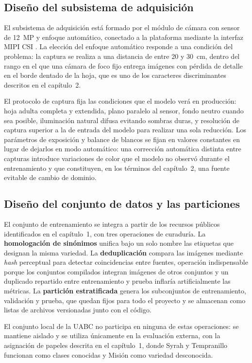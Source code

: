 \subsection{Diseño del subsistema de adquisición}

El subsistema de adquisición está formado por el módulo de cámara con sensor
de 12~MP y enfoque automático, conectado a la plataforma mediante la
interfaz MIPI CSI \citep{rpicam3}. La elección del enfoque automático
responde a una condición del problema: la captura se realiza a una distancia
de entre 20 y 30~cm, dentro del rango en el que una cámara de foco fijo
entrega imágenes con pérdida de detalle en el borde dentado de la hoja, que
es uno de los caracteres discriminantes descritos en el capítulo~2.

El protocolo de captura fija las condiciones que el modelo verá en
producción: hoja adulta completa y extendida, plano paralelo al sensor,
fondo neutro cuando sea posible, iluminación natural difusa evitando sombras
duras, y resolución de captura superior a la de entrada del modelo para
realizar una sola reducción. Los parámetros de exposición y balance de
blancos se fijan en valores constantes en lugar de dejarlos en modo
automático: una corrección automática distinta entre capturas introduce
variaciones de color que el modelo no observó durante el entrenamiento y que
constituyen, en los términos del capítulo~2, una fuente evitable de cambio de
dominio.

\subsection{Diseño del conjunto de datos y las particiones}

El conjunto de entrenamiento se integra a partir de los recursos públicos
identificados en el capítulo~1, con tres operaciones de curaduría. La
\textbf{homologación de sinónimos} unifica bajo un solo nombre las etiquetas
que designan la misma variedad. La \textbf{deduplicación} compara las
imágenes mediante \textit{hash} perceptual para detectar coincidencias entre
fuentes, operación indispensable porque los conjuntos compilados integran
imágenes de otros conjuntos y un duplicado repartido entre entrenamiento y
prueba inflaría artificialmente las métricas. La \textbf{partición
estratificada} genera los subconjuntos de entrenamiento, validación y prueba,
que quedan fijos para todo el proyecto y se almacenan como listas de archivos
versionadas junto con el código.

El conjunto local de la UABC no participa en ninguna de estas operaciones:
se mantiene aislado y se utiliza únicamente en la evaluación externa, con la
asignación de papeles descrita en el capítulo~1, donde Syrah y Tempranillo
funcionan como clases conocidas y Misión como variedad desconocida.

